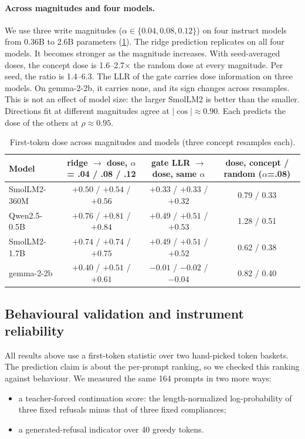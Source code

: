 \documentclass[11pt]{article}
\begin{document}
\paragraph{Across magnitudes and four models.} We use three write magnitudes ($\alpha\in\{0.04,0.08,0.12\}$)
on four instruct models from 0.36B to 2.6B parameters (\cref{tab:fourmodels}). The ridge prediction
replicates on all four models. It becomes stronger as the magnitude increases. With seed-averaged doses,
the concept dose is 1.6--2.7$\times$ the random dose at every magnitude. Per seed, the ratio is 1.4--6.3.
The LLR of the gate carries dose information on three models. On gemma-2-2b, it carries none, and its sign
changes across resamples. This is not an effect of model size: the larger SmolLM2 is better than the
smaller. Directions fit at different magnitudes agree at $|\cos|\approx0.90$. Each predicts the dose of the
others at $\rho\approx0.95$.

\begin{table}[t]
\centering
\footnotesize\setlength{\tabcolsep}{4pt}
\caption{First-token dose across magnitudes and models (three concept resamples each).}
\label{tab:fourmodels}
\begin{tabular}{lccc}
\toprule
Model & ridge $\to$ dose, $\alpha$ = .04 / .08 / .12 & gate LLR $\to$ dose, same $\alpha$ & dose, concept / random ($\alpha$=.08) \\
\midrule
SmolLM2-360M & $+0.50$ / $+0.54$ / $+0.56$ & $+0.33$ / $+0.33$ / $+0.32$ & 0.79 / 0.33 \\
Qwen2.5-0.5B & $+0.76$ / $+0.81$ / $+0.84$ & $+0.49$ / $+0.51$ / $+0.53$ & 1.28 / 0.51 \\
SmolLM2-1.7B & $+0.74$ / $+0.74$ / $+0.75$ & $+0.49$ / $+0.51$ / $+0.52$ & 0.62 / 0.38 \\
gemma-2-2b & $+0.40$ / $+0.51$ / $+0.61$ & $-0.01$ / $-0.02$ / $-0.04$ & 0.82 / 0.40 \\
\bottomrule
\end{tabular}
\end{table}

\subsection{Behavioural validation and instrument reliability}
\label{sec:instrument}
All results above use a first-token statistic over two hand-picked token baskets. The prediction claim is
about the per-prompt ranking, so we checked this ranking against behaviour. We measured the same 164 prompts in two more ways:
\begin{itemize}[leftmargin=*]
  \item a teacher-forced continuation score: the length-normalized log-probability of three fixed refusals
    minus that of three fixed compliances;
  \item a generated-refusal indicator over 40 greedy tokens.
\end{itemize}
\end{document}

